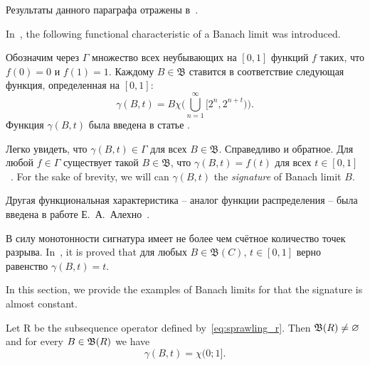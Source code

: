 Результаты данного параграфа отражены в~\cite{avdeev2024set_DAN_rus}.


In~\cite{semenov2019mainclasses_rus}, the following functional characteristic of a Banach limit was introduced.

 Обозначим через $\Gamma$ множество всех неубывающих на $[0, 1]$ функций $f$ таких,
    что $f(0) = 0$ и $f(1) = 1$. Каждому $B \in \mathfrak B$
    ставится в соответствие следующая функция, определенная на $[0, 1]$:
    $$
		\gamma(B, t) = B \chi\Bigg(\bigcup^\infty_{n = 1} [2^n, 2^{n + t})\Bigg)
		.
    $$
    Функция $\gamma(B,t)$ была введена в статье \cite{semenov2019mainclasses_rus}.

    Легко увидеть, что $\gamma (B, t) \in \Gamma$ для всех $B \in \mathfrak B$.
    Справедливо и обратное. Для любой $f \in \Gamma$ существует такой
	$B \in \mathfrak B$, что $\gamma(B, t) = f(t)$ для всех
	$t \in [0, 1]$~\cite[Предложение 2]{semenov2019mainclasses_rus}.
    For the sake of brevity, we will can $\gamma(B,t)$ the \emph{signature}
    of Banach limit $B$.

	Другая функциональная характеристика -- аналог функции распределения -- была введена в работе Е.~А.~Алехно~\cite{Alekhno2:TODO}.

	В силу монотонности сигнатура имеет не более чем счётное количество точек разрыва.
	In~\cite[Теорема 23]{semenov2019mainclasses_rus}, it is proved that
	для любых $B \in \mathfrak B(C)$, $t \in [0, 1]$ верно равенство $\gamma (B, t) = t$.




In this section, we provide the examples of Banach limits for that the signature is almost constant.

\begin{lemma}
	Let R be the subsequence operator
	defined by~\eqref{eq:sprawling_r}.
	Then $\mathfrak{B}(R) \ne\varnothing$ and for every $B\in \mathfrak{B}(R)$ we have
	\begin{equation}
		\gamma(B, t) = \chi(0;1]
		.
	\end{equation}
\end{lemma}

